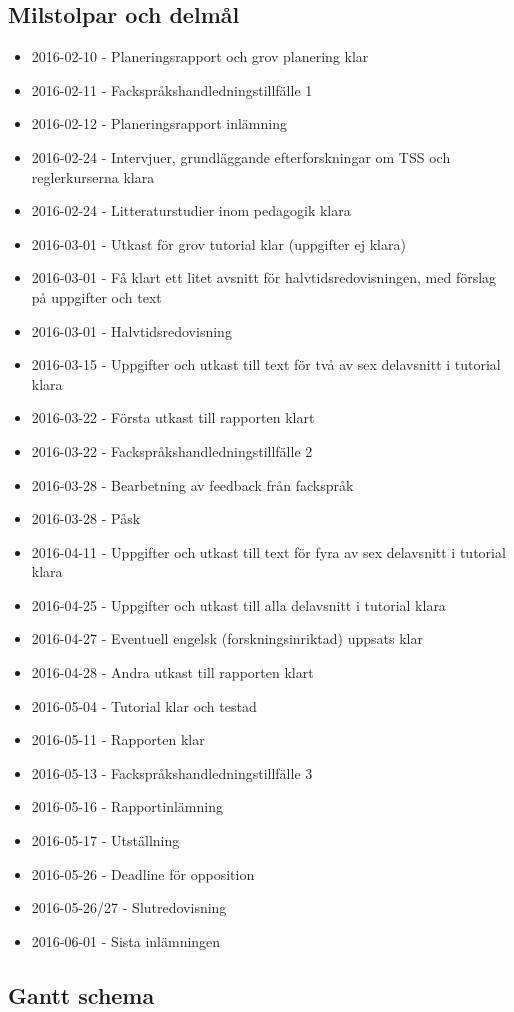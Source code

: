 \documentclass{article}
\begin{document}
\subsection{Milstolpar och delmål}
\begin{itemize}
\item 2016-02-10 - Planeringsrapport och grov planering klar
\item 2016-02-11 - Fackspråkshandledningstillfälle 1
\item 2016-02-12 - Planeringsrapport inlämning
\item 2016-02-24 - Intervjuer, grundläggande efterforskningar om TSS och reglerkurserna klara
\item 2016-02-24 - Litteraturstudier inom pedagogik klara
\item 2016-03-01 - Utkast för grov tutorial klar (uppgifter ej klara)
\item 2016-03-01 - Få klart ett litet avsnitt för halvtidsredovisningen, med förslag på uppgifter och text
\item 2016-03-01 - Halvtidsredovisning
\item 2016-03-15 - Uppgifter och utkast till text för två av sex delavsnitt i tutorial klara
\item 2016-03-22 - Första utkast till rapporten klart
\item 2016-03-22 - Fackspråkshandledningstillfälle 2
\item 2016-03-28 - Bearbetning av feedback från fackspråk
\item 2016-03-28 - Påsk
\item 2016-04-11 - Uppgifter och utkast till text för fyra av sex delavsnitt i tutorial klara
\item 2016-04-25 - Uppgifter och utkast till alla delavsnitt i tutorial klara
\item 2016-04-27 - Eventuell engelsk (forskningsinriktad) uppsats klar
\item 2016-04-28 - Andra utkast till rapporten klart
\item 2016-05-04 - Tutorial klar och testad
\item 2016-05-11 - Rapporten klar
\item 2016-05-13 - Fackspråkshandledningstillfälle 3
\item 2016-05-16 - Rapportinlämning
\item 2016-05-17 - Utställning
\item 2016-05-26 - Deadline för opposition
\item 2016-05-26/27 - Slutredovisning
\item 2016-06-01 - Sista inlämningen
\end{itemize}

\newpage
\subsection{Gantt schema}
\begin{figure}
    \centering
    
\end{figure}
\end{document}
